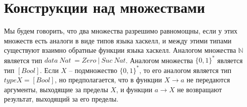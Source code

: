\section{Конструкции над множествами}

\def\doubleunderline#1{\underline{\underline{#1}}}

Мы будем говорить, что два множества разрешимо равномощны, если у этих множеств есть аналоги в виде типов 
языка хаскелл, и между этими типами существуют взаимно обратные функции языка хаскелл. Аналогом множества 
$\mathbb{N}$ является тип $data\ Nat\ = Zero\ |\ Suc\ Nat$. Аналогом множества $\{0,1\}^*$ является тип 
$[Bool]$. Если $X$ -- подмножество $\{0,1\}^*$, то его аналогом является тип $type X = [Bool]$, но 
предполагается, что в функции $X \to a$ не передаются аргументы, выходящие за пределы $X$, и функции $a \to 
X$ не возвращают результат, выходящий за его пределы.

